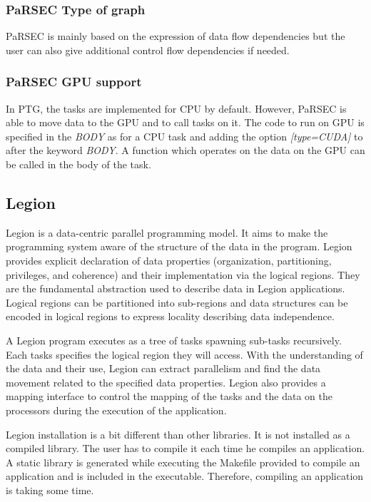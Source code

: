 \subsubsection{PaRSEC Type of graph}
PaRSEC is mainly based on the expression of data flow dependencies but the user can also give additional control flow dependencies if needed.

\subsubsection{PaRSEC GPU support}
In PTG, the tasks are implemented for CPU by default.
However, PaRSEC is able to move data to the GPU and to call tasks on it.
The code to run on GPU is specified in the \textit{BODY} as for a CPU task and adding the option \textit{[type=CUDA]} to
after the keyword \textit{BODY}.
A function which operates on the data on the GPU can be called in the body of the task.


\subsection{Legion}
Legion \cite{BaTSA2012} is a data-centric parallel programming model.
It aims to make the programming system aware of the structure of the data in the program.
Legion provides explicit declaration of data properties (organization, partitioning, privileges, and coherence) and their implementation via the logical regions.
They are the fundamental abstraction used to describe data in Legion applications.
Logical regions can be partitioned into sub-regions and data structures can be encoded in logical regions to express locality describing data independence.

A Legion program executes as a tree of tasks spawning sub-tasks recursively.
Each tasks specifies the logical region they will access.
With the understanding of the data and their use, Legion can extract parallelism and find the data movement related to the specified data properties.
Legion also provides a mapping interface to control the mapping of the tasks and the data on the processors during the execution of the application.

Legion installation is a bit different than other libraries.
It is not installed as a compiled library.
The user has to compile it each time he compiles an application.
A static library is generated while executing the Makefile provided to compile an application and is included in the executable.
Therefore, compiling an application is taking some time.


